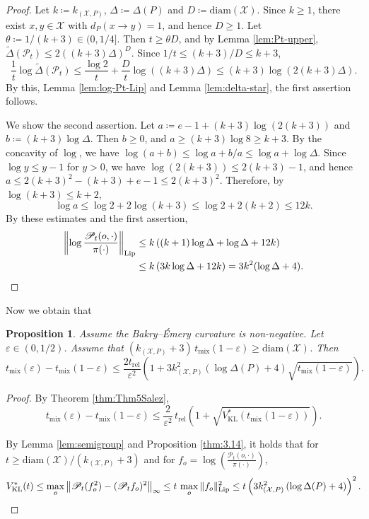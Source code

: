 \documentclass[a4paper, reqno, 11pt]{amsart}
\newtheorem{Prop}[Thm]{Proposition}
\theoremstyle{definition}
\begin{document}
\begin{proof}
Let $k \coloneqq k_{(\mathcal{X}, P)}$, $\Delta \coloneqq \Delta(P)$ and $D \coloneqq \mathrm{diam}(\mathcal{X})$.
Since $k \ge 1$, there exist $x, y \in \mathcal{X}$ with $d_{P}(x \to y) = 1$, and hence $D \ge 1$.
Let $\theta \coloneqq 1/(k+3) \in (0, 1/4]$.
Then $t \ge \theta D$, and by Lemma \ref{lem:Pt-upper}, $\widetilde{\Delta}(\mathscr{P}_t) \le 2 ((k+3)\Delta)^{D}$.
Since $1/t \le (k+3)/D \le k+3$,
\[ \frac{1}{t} \log \widetilde{\Delta}(\mathscr{P}_t) \le \frac{\log 2}{t} + \frac{D}{t} \log((k+3)\Delta) \le (k+3) \log\left(2(k+3)\Delta\right). \]
By this, Lemma \ref{lem:log-Pt-Lip} and Lemma \ref{lem:delta-star}, the first assertion follows.

We show the second assertion.
Let $a \coloneqq e - 1 + (k+3)\log(2(k+3))$ and $b \coloneqq (k+3) \log \Delta$.
Then $b \ge 0$, and $a \ge (k+3) \log 8 \ge k+3$.
By the concavity of $\log$, we have $\log(a + b) \le \log a + b/a \le \log a + \log \Delta$.
Since $\log y \le y - 1$ for $y > 0$, we have $\log(2(k+3)) \le 2(k+3) - 1$, and hence $a \le 2(k+3)^{2} - (k+3) + e - 1 \le 2(k+3)^{2}$.
Therefore, by $\log(k+3) \le k+2$,
\[ \log a \le \log 2 + 2\log(k+3) \le \log 2 + 2(k+2) \le 12k. \]
By these estimates and the first assertion,
\begin{align*} 
\left\|\log\frac{\mathscr{P}_t (o,\cdot)}{\pi(\cdot)}\right\|_{\mathrm{Lip}} 
&\le k \left( (k+1)\log\Delta + \log\Delta + 12k \right) \\
&\le k \left( 3k \log\Delta + 12k \right) = 3k^{2}(\log\Delta + 4). \qedhere 
\end{align*}
\end{proof}

Now we obtain that 
\begin{Prop}\label{thm:5.1}
Assume the Bakry--\'Emery curvature is non-negative. 
Let $\varepsilon \in (0,1/2)$.
Assume that $(k_{(\mathcal{X}, P)}+3)\,t_{\mathrm{mix}}(1-\varepsilon) \ge \mathrm{diam}(\mathcal{X})$.
Then
\[ t_{\mathrm{mix}}(\varepsilon)-t_{\mathrm{mix}}(1-\varepsilon) \le \frac{2t_{\mathrm{rel}}}{\varepsilon^2} \left(1 + 3k_{(\mathcal{X}, P)}^2 \left(\log\Delta(P)+4\right)\sqrt{t_{\mathrm{mix}}(1-\varepsilon)}\right). \]
\end{Prop}

\begin{proof}
By Theorem \ref{thm:Thm5Salez},
\[ t_{\mathrm{mix}}(\varepsilon)-t_{\mathrm{mix}}(1-\varepsilon) \le \frac{2}{\varepsilon^2}\,t_{\mathrm{rel}} \left(1+\sqrt{V_{\mathrm{KL}}^{*}\!\left(t_{\mathrm{mix}}(1-\varepsilon)\right)}\right).\]

By Lemma \ref{lem:semigroup} and Proposition \ref{thm:3.14}, 
it holds that for $t \ge \mathrm{diam}(\mathcal{X})/(k_{(\mathcal{X}, P)}+3)$ and for $f_o=\log\left(\frac{\mathscr{P}_{t}(o,\cdot)}{\pi(\cdot)}\right)$, 
\[ V_{\mathrm{KL}}^{*}(t) \le \max_{o}\left\|\mathscr{P}_{t}(f_o^2)-(\mathscr{P}_{t} f_o)^2\right\|_\infty  \le t\,\max_{o}\|f_o\|_{\mathrm{Lip}}^2 \le t\left(3k_{(\mathcal{X}, P)}^2\left(\log\Delta(P)+4\right)\right)^2. \qedhere \]
\end{proof}
\end{document}
